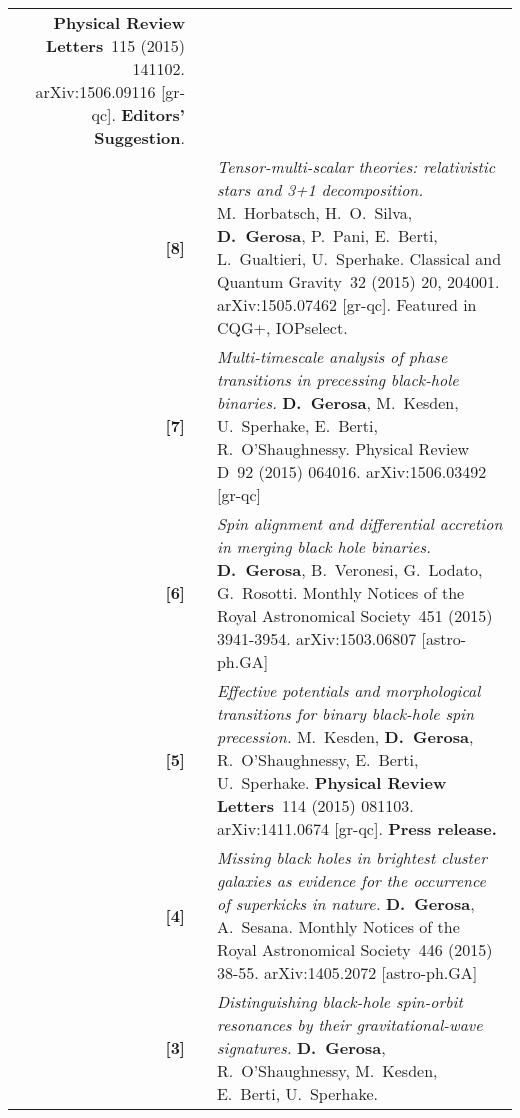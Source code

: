 \documentclass[11pt,a4paper,sans]{moderncv}   %
\newcommand{\mnras}{Monthly Notices of the Royal Astronomical Society}
\newcommand{\prd}{Physical Review D}
\newcommand{\prl}{Physical Review Letters}
\newcommand{\cqg}{Classical and Quantum Gravity}
\begin{document}
{\begin{longtable}{rp{0.3cm}p{15.8cm}}
\textbf{\prl}~115 (2015) 141102.
arXiv:1506.09116 [gr-qc].  \textbf{Editors' Suggestion}.
\vspace{0.05cm}\\
\textbf{[8]} & & \textit{Tensor-multi-scalar theories: relativistic stars and 3+1 decomposition.} 
\newline{}
M.~Horbatsch, H.~O.~Silva, \textbf{D.~Gerosa}, P.~Pani,  E.~Berti, L.~Gualtieri, U.~Sperhake.
  \newline{}
\cqg~32 (2015) 20, 204001.
arXiv:1505.07462 [gr-qc]. Featured in CQG+, IOPselect.\!\vspace{0.05cm}\\
\textbf{[7]} & & \textit{Multi-timescale analysis of phase transitions in precessing black-hole binaries.} 
\newline{}
\textbf{D.~Gerosa}, M.~Kesden, U.~Sperhake, E.~Berti, R.~O’Shaughnessy.
  \newline{}
\prd~92 (2015) 064016. arXiv:1506.03492 [gr-qc]
\vspace{0.05cm}\\
\textbf{[6]} & & \textit{Spin alignment and differential accretion in merging black hole binaries.}
\newline{}
\textbf{D.~Gerosa}, B.~Veronesi, G.~Lodato, G.~Rosotti. 
\newline{}
\mnras~451 (2015) 3941-3954. arXiv:1503.06807 [astro-ph.GA]
\vspace{0.05cm}\\
\textbf{[5]} & & \textit{Effective potentials and morphological transitions for binary black-hole spin precession.}
\newline{}
M.~Kesden, \textbf{D.~Gerosa}, R.~O'Shaughnessy, E.~Berti, U.~Sperhake.
\newline{}
\textbf{\prl}~114 (2015) 081103. arXiv:1411.0674 [gr-qc]. \textbf{Press release.}
\vspace{0.05cm}\\
\textbf{[4]} & & \textit{Missing black holes in brightest cluster galaxies as evidence for the occurrence of superkicks in nature.}
\newline{}
\textbf{D.~Gerosa}, A.~Sesana.
\newline{}
\mnras~446 (2015) 38-55. arXiv:1405.2072 [astro-ph.GA]
\vspace{0.05cm}\\
\textbf{[3]} & & \textit{Distinguishing black-hole spin-orbit resonances by their gravitational-wave signatures.}
\newline{}
\textbf{D.~Gerosa}, R.~O'Shaughnessy, M.~Kesden, E.~Berti, U.~Sperhake. 

\end{longtable}}
\end{document}
